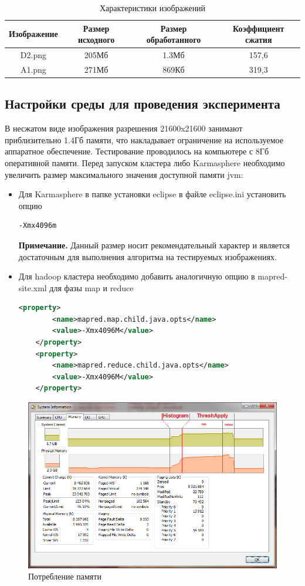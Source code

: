 \documentclass[12pt,a4paper]{extarticle} %
\begin{document}
\begin{table}[h]
	\begin{tabular}{|c|c|c|c|}
		Изображение& Размер исходного & Размер обработанного & Коэффициент сжатия\\ \hline
		D2.png&205Мб&1.3Мб&157,6\\
		A1.png&271Мб&869Кб&319,3\\
	\end{tabular}
	\caption{Характеристики изображений}
\end{table}

\subsection{Настройки среды для проведения эксперимента}

	В несжатом виде изображения разрешения 21600x21600 занимают приблизительно 1.4Гб памяти, что накладывает ограничение на используемое аппаратное обеспечение. Тестирование проводилось на компьютере с 8Гб оперативной памяти. Перед запуском кластера либо Karmasphere необходимо увеличить размер максимального значения доступной памяти jvm:
\begin{itemize}
	\item Для Karmasphere в папке установки eclipse в файле eclipse.ini установить опцию 
\begin{lstlisting}[language=sh]
    -Xmx4096m
\end{lstlisting}
	\textbf{Примечание.} Данный размер носит рекомендательный характер и является достаточным для выполнения алгоритма на тестируемых изображениях.
	\item Для hadoop кластера необходимо добавить аналогичную опцию в mapred-site.xml для фазы map и reduce
\begin{lstlisting}[language=xml]
    <property>
        <name>mapred.map.child.java.opts</name>
        <value>-Xmx4096M</value>
    </property>
    <property>
        <name>mapred.reduce.child.java.opts</name>
        <value>-Xmx4096M</value>
    </property>
\end{lstlisting}
\end{itemize}


\begin{figure}[h]
    \centering
    \includegraphics[width=\textwidth]{images/memprofjob.png}
	\caption{Потребление памяти}
\end{figure}
\end{document}
